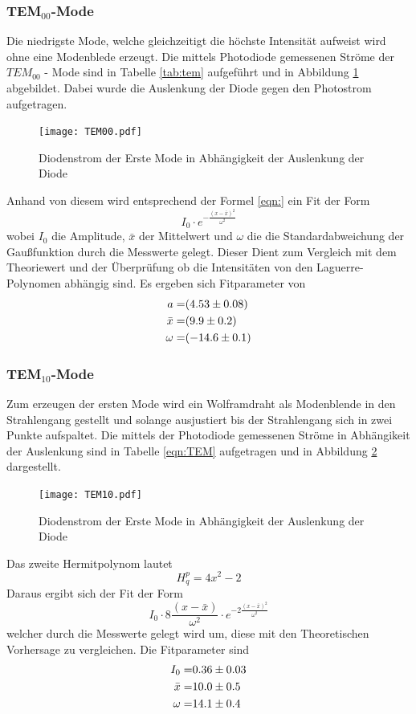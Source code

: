 \subsubsection{TEM$_\text{00}$-Mode}
Die niedrigste Mode, welche gleichzeitigt die höchste Intensität aufweist wird ohne eine Modenblede erzeugt. Die mittels Photodiode gemessenen Ströme der $TEM_{00}$ - Mode sind in Tabelle \ref{tab:tem} aufgeführt und in Abbildung \ref{fig:TEM00} abgebildet. Dabei wurde die Auslenkung der Diode gegen den Photostrom aufgetragen.
\begin{figure}
  \centering
  \texttt{[image: TEM00.pdf]}
  \caption{Diodenstrom der Erste Mode in Abhängigkeit der Auslenkung der Diode}
  \label{fig:TEM00}
\end{figure}

Anhand von diesem wird entsprechend der Formel \ref{eqn:} ein Fit der Form 
\begin{equation}
  I_0 \cdot e^{- \frac{(x-\bar{x})^2}{\omega^2} }
  \label{eqn:gausian}
\end{equation}
wobei $I_0$ die Amplitude, $\bar{x}$ der Mittelwert und $\omega$ die die Standardabweichung der Gaußfunktion durch die Messwerte gelegt. Dieser Dient zum Vergleich mit dem Theoriewert und der Überprüfung ob die Intensitäten von den Laguerre-Polynomen abhängig sind. Es ergeben sich Fitparameter von 
\begin{eqnarray}
  a =& (\num{4.53 +- 0.08})	\\
  \bar{x} =& (\num{9.9 +- 0.2})	\\
  \omega =& (\num{-14.6 +-0.1})	
  \label{eqn:coef}
\end{eqnarray}
\subsubsection{TEM$_\text{10}$-Mode}
Zum erzeugen der ersten Mode wird ein Wolframdraht als Modenblende in den Strahlengang gestellt und solange ausjustiert bis der Strahlengang sich in zwei Punkte aufspaltet. Die mittels der Photodiode gemessenen Ströme in Abhängikeit der Auslenkung sind in Tabelle \ref{eqn:TEM} aufgetragen und in Abbildung \ref{fig:TEM10} dargestellt.
\begin{figure}
  \centering
  \texttt{[image: TEM10.pdf]}
  \caption{Diodenstrom der Erste Mode in Abhängigkeit der Auslenkung der Diode}
  \label{fig:TEM10}
\end{figure}
Das zweite Hermitpolynom lautet
\begin{equation}
  H_q^p = 4x^2 - 2
  \label{eqn:Herm}
\end{equation}
Daraus ergibt sich der Fit der Form 
\begin{equation}
  I_0 \cdot 8 \frac{\left( x - \bar{x} \right)}{\omega^2} \cdot e^{-2 \frac{\left( x - \bar{x} \right)^2}{\omega^2}}
  \label{eqn:TEM10}
\end{equation}
welcher durch die Messwerte gelegt wird um, diese mit den Theoretischen Vorhersage zu vergleichen. Die Fitparameter sind
\begin{eqnarray}
  I_0 =& \num{0.36 +- 0.03}	\\
  \bar{x} =& \num{10.0 +- 0.5} \\
  \omega =& \num{14.1 +- 0.4}
\end{eqnarray}


